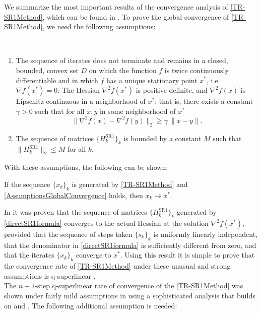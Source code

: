 We summarize the most important results of the convergence analysis of \cref{TR-SR1Method}, which can be found in \cite{ByrdKhalfanSchnabel:1996}. To prove the global convergence of \cref{TR-SR1Method}, we need the following assumptions:  
\begin{assumption}\label{AssumptionsGlobalConvergence} \ \\[-1.5\baselineskip]
    \begin{enumerate}
        \item The sequence of iterates does not terminate and remains in a closed, bounded, convex set $D$ on which the function $f$ is twice continuously differentiable and in which $f$ has a unique stationary point $x^*$, i.e. $\nabla f(x^*) = 0$. The Hessian $\nabla^2 f(x^*)$ is positive definite, and $\nabla^2 f(x)$ is Lipschitz continuous in a neighborhood of $x^*$; that is, there exists a constant $\gamma > 0$ such that for all $x, y$ in some neighborhood of $x^*$ \begin{equation*} \lVert \nabla^2 f(x) - \nabla^2 f(y) \rVert_2 \geq \gamma \ \lVert x - y \rVert. \end{equation*}
        \item The sequence of matrices $\{ H^{\mathrm{SR1}}_k \}_k$ is bounded by a constant $M$ such that $\lVert H^{\mathrm{SR1}}_k \rVert_2 \leq M$ for all $k$.
    \end{enumerate}
\end{assumption}
With these assumptions, the following can be shown: 
\begin{theorem} \label{GlobalConvergence}
    If the sequence $\{ x_k \}_k$ is generated by \cref{TR-SR1Method} and \cref{AssumptionsGlobalConvergence} holds, then $x_k \rightarrow x^*$.
\end{theorem}
In \cite{ConnGouldToint:1991} it was proven that the sequence of matrices $\{ H^{\mathrm{SR1}}_k \}_k$ generated by \cref{directSR1formula} converges to the actual Hessian at the solution $\nabla^2 f(x^*)$, provided that the sequence of steps taken $\{ s_k \}_k$ is uniformly linearly independent, that the denominator in \cref{directSR1formula} is sufficiently different from zero, and that the iterates $\{ x_k \}_k$ converge to $x^*$. Using this result it is simple to prove that the convergence rate of \cref{TR-SR1Method} under these unusual and strong assumptions is q-superlinear \cite[p.~1026]{ByrdKhalfanSchnabel:1996}. \\
The $n+1$-step q-superlinear rate of convergence of the \cref{TR-SR1Method} was shown under fairly mild assumptions in \cite{ByrdKhalfanSchnabel:1996} using a sophisticated analysis that builds on \cite{ConnGouldToint:1991} and \cite{KhalfanByrdSchnabel:1993}. The following additional assumption is needed: 
